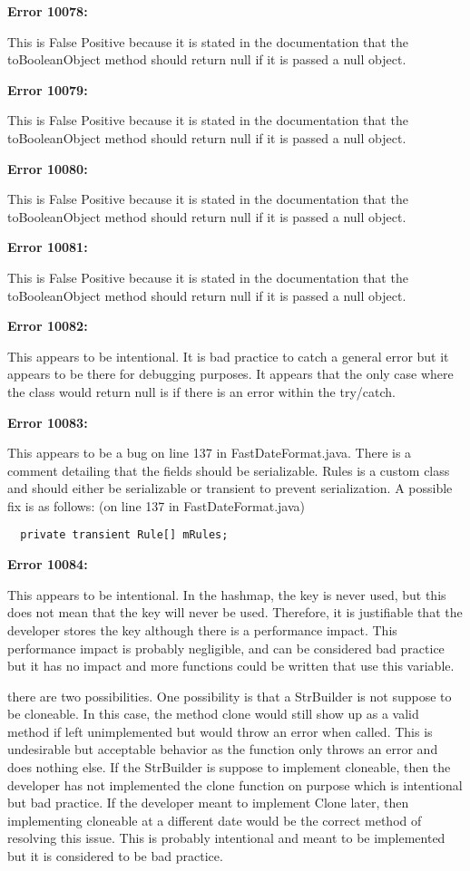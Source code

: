 \documentclass{article}
\begin{document}
\begin{enumerate}[(a)]
  \textbf{Error 10078:}
  
  This is False Positive because it is stated in the documentation that the toBooleanObject method should return null if it is passed a null object.
  
  \textbf{Error 10079:}
  
  This is False Positive because it is stated in the documentation that the toBooleanObject method should return null if it is passed a null object.
  
  \textbf{Error 10080:}
  
  This is False Positive because it is stated in the documentation that the toBooleanObject method should return null if it is passed a null object.
  
  \textbf{Error 10081:}
  
  This is False Positive because it is stated in the documentation that the toBooleanObject method should return null if it is passed a null object.

  \textbf{Error 10082:}
  
  This appears to be intentional. It is bad practice to catch a general error but it appears to be there for debugging purposes. It appears that the only case where the class would return null is if there is an error within the try/catch.
  
  \textbf{Error 10083:}
  
  This appears to be a bug on line 137 in FastDateFormat.java. There is a comment detailing that the fields should be serializable. Rules is a custom class and should either be serializable or transient to prevent serialization. A possible fix is as follows: (on line 137 in FastDateFormat.java)

  \begin{lstlisting}
  private transient Rule[] mRules;
  \end{lstlisting}

  \textbf{Error 10084:}
  
  This appears to be intentional. In the hashmap, the key is never used, but this does not mean that the key will never be used. Therefore, it is justifiable that the developer stores the key although there is a performance impact. This performance impact is probably negligible, and can be considered bad practice but it has no impact and more functions could be written that use this variable.

  there are two possibilities. One possibility is that a StrBuilder is not suppose to be cloneable. In this case, the method clone would still show up as a valid method if left unimplemented but would throw an error when called. This is undesirable but acceptable behavior as the function only throws an error and does nothing else. If the StrBuilder is suppose to implement cloneable, then the developer has not implemented the clone function on purpose which is intentional but bad practice. If the developer meant to implement Clone later, then implementing cloneable at a different date would be the correct method of resolving this issue. This is probably intentional and meant to be implemented but it is considered to be bad practice.


\end{enumerate}
\end{document}
